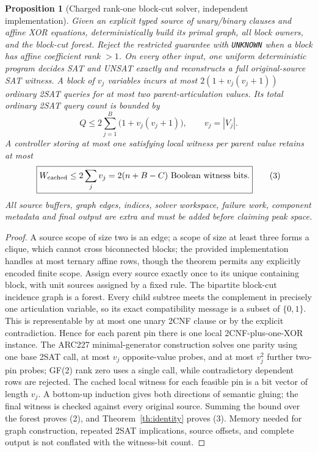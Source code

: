 \documentclass[10pt]{article}
\newtheorem{proposition}[theorem]{Proposition}
\begin{document}
\begin{proposition}[Charged rank-one block-cut solver, independent implementation]\label{prop:solver}
Given an explicit typed source of unary/binary clauses and affine XOR equations, deterministically build its primal graph, all block owners, and the block-cut forest. Reject the restricted guarantee with \texttt{UNKNOWN} when a block has affine coefficient rank $>1$. On every other input, one uniform deterministic program decides SAT and UNSAT exactly and reconstructs a full original-source SAT witness. A block of $v_j$ variables incurs at most $2(1+v_j(v_j+1))$ ordinary 2SAT queries for at most two parent-articulation values. Its total ordinary 2SAT query count is bounded by
\[
 Q\le 2\sum_{j=1}^{B}\bigl(1+v_j(v_j+1)\bigr),\qquad v_j=|V_j|.
 \tag{2}
\]
A controller storing at most one satisfying local witness per parent value retains at most
\[
\boxed{W_{\rm cached}\le2\sum_jv_j=2(n+B-C)\text{ Boolean witness bits}.}\tag{3}
\]
All source buffers, graph edges, indices, solver workspace, failure work, component metadata and final output are extra and must be added before claiming peak space.
\end{proposition}
\begin{proof}
A source scope of size two is an edge; a scope of size at least three forms a clique, which cannot cross biconnected blocks; the provided implementation handles at most ternary affine rows, though the theorem permits any explicitly encoded finite scope. Assign every source exactly once to its unique containing block, with unit sources assigned by a fixed rule. The bipartite block-cut incidence graph is a forest. Every child subtree meets the complement in precisely one articulation variable, so its exact compatibility message is a subset of $\{0,1\}$. This is representable by at most one unary 2CNF clause or by the explicit contradiction. Hence for each parent pin there is one local 2CNF-plus-one-XOR instance. The ARC227 minimal-generator construction solves one parity using one base 2SAT call, at most $v_j$ opposite-value probes, and at most $v_j^2$ further two-pin probes; GF(2) rank zero uses a single call, while contradictory dependent rows are rejected. The cached local witness for each feasible pin is a bit vector of length $v_j$. A bottom-up induction gives both directions of semantic gluing; the final witness is checked against every original source. Summing the bound over the forest proves (2), and Theorem~\ref{th:identity} proves (3). Memory needed for graph construction, repeated 2SAT implications, source offsets, and complete output is not conflated with the witness-bit count.
\end{proof}
\end{document}
